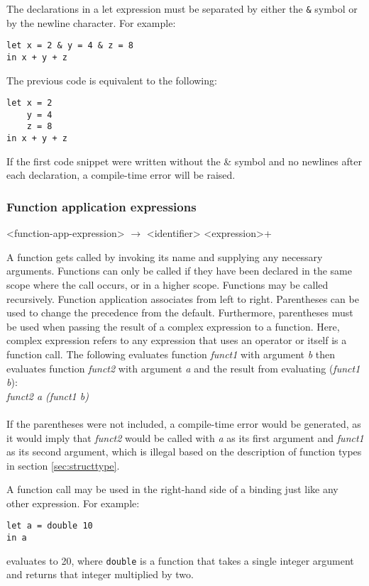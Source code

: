 The declarations in a let expression must be separated by either the \texttt{\&} symbol or by the newline character. For example:

\begin{verbatim}
let x = 2 & y = 4 & z = 8 
in x + y + z
\end{verbatim}

The previous code is equivalent to the following:

\begin{verbatim}
let x = 2
    y = 4
    z = 8
in x + y + z
\end{verbatim}

If the first code snippet were written without the \& symbol and no newlines after each declaration, a compile-time error will be raised.

\subsubsection{Function application expressions}

\begin{grammar}
<function-app-expression> $\rightarrow$ <identifier> <expression>+
\end{grammar}

A function gets called by invoking its name and supplying any necessary arguments. 
Functions can only be called if they have been declared in the same scope where the call occurs,
or in a higher scope. Functions may be called recursively. Function application associates 
from left to right. Parentheses can be used to change the precedence from the default. Furthermore,
parentheses must be used when passing the result of a complex expression to a function. Here, complex expression
refers to any expression that uses an operator or itself is a function call.
The following evaluates function \emph{funct1} with argument \emph{b} then evaluates function
\emph{funct2} with argument \emph{a} and the result from evaluating (\emph{funct1 b}): \\
    
    \emph{funct2 a (funct1 b)}\\ \\
If the parentheses were not included, a compile-time error would be generated, as it would imply
that \emph{funct2} would be called with \emph{a} as
its first argument and \emph{funct1} as its second argument, which is illegal based on the description
of function types in section \ref{sec:structtype}.

A function call may be used in the right-hand side of a binding just like any other expression. 
For example:
\begin{verbatim}
let a = double 10 
in a
\end{verbatim}
evaluates to 20, where \texttt{double} is a function that takes a single integer argument and
returns that integer multiplied by two. 

